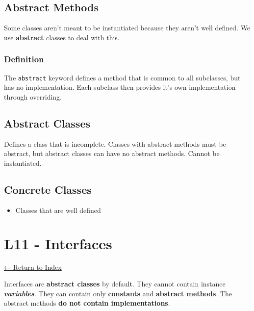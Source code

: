 \documentclass[]{article}
\providecommand{\tightlist}{%
  \setlength{\itemsep}{0pt}\setlength{\parskip}{0pt}}
\begin{document}
\hypertarget{abstract-methods}{%
\subsection{Abstract Methods}\label{abstract-methods}}

Some classes aren't meant to be instantiated because they aren't well
defined. We use \textbf{abstract} classes to deal with this.

\hypertarget{definition-1}{%
\subsubsection{Definition}\label{definition-1}}

The \texttt{abstract} keyword defines a method that is common to all
subclasses, but has no implementation. Each subclass then provides it's
own implementation through overriding.

\hypertarget{abstract-classes}{%
\subsection{Abstract Classes}\label{abstract-classes}}

Defines a class that is incomplete. Classes with abstract methods must
be abstract, but abstract classes can have no abstract methods. Cannot
be instantiated.

\hypertarget{concrete-classes}{%
\subsection{Concrete Classes}\label{concrete-classes}}

\begin{itemize}
\tightlist
\item
  Classes that are well defined
\end{itemize}

\hypertarget{l11---interfaces}{%
\section{L11 - Interfaces}\label{l11---interfaces}}

\protect\hyperlink{table-of-contents}{← Return to Index}

Interfaces are \textbf{abstract classes} by default. They cannot contain
instance \textbf{\emph{variables}}. They can contain only
\textbf{constants} and \textbf{abstract methods}. The abstract methods
\textbf{do not contain implementations}.
\end{document}
